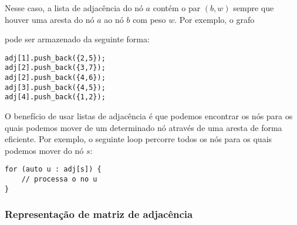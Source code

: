 Nesse caso, a lista de adjacência do nó $a$ contém o par $(b,w)$ sempre que houver uma aresta do nó $a$ ao nó $b$ com peso $w$. Por exemplo, o grafo

\begin{center}
\end{center}
pode ser armazenado da seguinte forma:
\begin{lstlisting}
adj[1].push_back({2,5});
adj[2].push_back({3,7});
adj[2].push_back({4,6});
adj[3].push_back({4,5});
adj[4].push_back({1,2});
\end{lstlisting}

O benefício de usar listas de adjacência é que podemos encontrar os nós para os quais podemos mover de um determinado nó através de uma aresta de forma eficiente. Por exemplo, o seguinte loop percorre todos os nós para os quais podemos mover do nó $s$:

\begin{lstlisting}
for (auto u : adj[s]) {
    // processa o no u
}
\end{lstlisting}

\subsubsection{Representação de matriz de adjacência}


